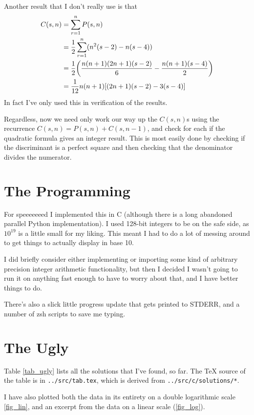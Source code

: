 \documentclass[fleqn,a4paper,11pt]{article}
\begin{document}
Another result that I don't really use is that
\begin{align*}
C(s, n) &= \sum_{r = 1}^n P(s, n) \\
    &= \frac 12 \sum_{r = 1}^n (n^2(s - 2) - n(s - 4)) \\
    &= \frac 12 \pqty{\frac{n(n + 1)(2n + 1)(s - 2)} 6
                    - \frac{n(n + 1)(s - 4)} 2} \\
    &= \frac 1{12}n(n + 1)\bqty{(2n + 1)(s - 2) - 3(s - 4)}
\end{align*}
In fact I've only used this in verification of the results.

Regardless, now we need only work our way up the \(C(s, n)\)s using the
recurrence \(C(s, n) = P(s, n) + C(s, n - 1)\), and check for each if the
quadratic formula gives an integer result. This is most easily done by checking
if the discriminant is a perfect square and then checking that the denominator
divides the numerator.

\section{The Programming}

For speeeeeeed I implemented this in C (although there is a long abandoned
parallel Python implementation). I used 128-bit integers to be on the safe side,
as \(10^{19}\) is a little small for my liking. This meant I had to do a lot of
messing around to get things to actually display in base 10.

I did briefly consider either implementing or importing some kind of arbitrary
precision integer arithmetic functionality, but then I decided I wasn't going to
run it on anything fast enough to have to worry about that, and I have better
things to do.

There's also a slick little progress update that gets printed to STDERR, and a
number of zsh scripts to save me typing.

\section{The Ugly}

Table \ref{tab_ugly} lists all the solutions that I've found, so far. The \TeX
source of the table is in \texttt{../src/tab.tex}, which is derived from
\texttt{../src/c/solutions/*}.

I have also plotted both the data in its entirety on a double logarithmic scale
\ref{fig_lin}, and an excerpt from the data on a linear scale (\ref{fig_log}).
\end{document}
